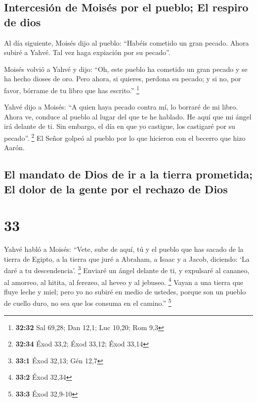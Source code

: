 \hypertarget{intercesiuxf3n-de-moisuxe9s-por-el-pueblo-el-respiro-de-dios}{%
\subsection{Intercesión de Moisés por el pueblo; El respiro de
dios}\label{intercesiuxf3n-de-moisuxe9s-por-el-pueblo-el-respiro-de-dios}}

 Al día siguiente, Moisés dijo al pueblo: ``Habéis
cometido un gran pecado. Ahora subiré a Yahvé. Tal vez haga expiación
por su pecado''.

 Moisés volvió a Yahvé y dijo: ``Oh, este pueblo ha
cometido un gran pecado y se ha hecho dioses de oro. 
Pero ahora, si quieres, perdona su pecado; y si no, por favor, bórrame
de tu libro que has escrito.'' \footnote{\textbf{32:32} Sal 69,28; Dan
  12,1; Luc 10,20; Rom 9,3}

 Yahvé dijo a Moisés: ``A quien haya pecado contra mí, lo
borraré de mi libro.  Ahora ve, conduce al pueblo al
lugar del que te he hablado. He aquí que mi ángel irá delante de ti. Sin
embargo, el día en que yo castigue, los castigaré por su pecado''.
\footnote{\textbf{32:34} Éxod 33,2; Éxod 33,12; Éxod 33,14}
 El Señor golpeó al pueblo por lo que hicieron con el
becerro que hizo Aarón.

\hypertarget{el-mandato-de-dios-de-ir-a-la-tierra-prometida-el-dolor-de-la-gente-por-el-rechazo-de-dios}{%
\subsection{El mandato de Dios de ir a la tierra prometida; El dolor de
la gente por el rechazo de
Dios}\label{el-mandato-de-dios-de-ir-a-la-tierra-prometida-el-dolor-de-la-gente-por-el-rechazo-de-dios}}

\hypertarget{section-32}{%
\section{33}\label{section-32}}

 Yahvé habló a Moisés: ``Vete, sube de aquí, tú y el
pueblo que has sacado de la tierra de Egipto, a la tierra que juré a
Abraham, a Isaac y a Jacob, diciendo: `La daré a tu descendencia'.
\footnote{\textbf{33:1} Éxod 32,13; Gén 12,7}  Enviaré un
ángel delante de ti, y expulsaré al cananeo, al amorreo, al hitita, al
ferezeo, al heveo y al jebuseo. \footnote{\textbf{33:2} Éxod 32,34}
 Vayan a una tierra que fluye leche y miel; pero yo no
subiré en medio de ustedes, porque son un pueblo de cuello duro, no sea
que los consuma en el camino.'' \footnote{\textbf{33:3} Éxod 32,9-10}

